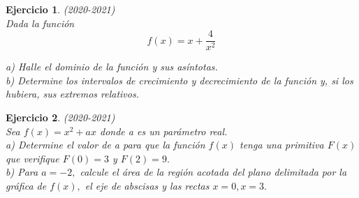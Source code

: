 \documentclass[12pt, a4paper]{amsart}
\newtheorem{ejer}{Ejercicio}
\begin{document}
\begin{ejer}\em (2020-2021)\\%
Dada la función
\[f (x) = x +\frac{4}{x^2}\]

a) Halle el dominio de la función y sus asíntotas.\\
b) Determine los intervalos de crecimiento y decrecimiento de la función y, si los hubiera, sus extremos relativos.
\end{ejer}

\begin{ejer}\em (2020-2021)\\%
Sea $f (x) = x^2 + ax$ donde a es un parámetro real.\\
a) Determine el valor de a para que la función $f (x)$ tenga una primitiva $F (x)$ que verifique $F (0) = 3$ y $F (2) = 9.$\\
b) Para $a = - 2,$ calcule el área de la región acotada del plano delimitada por la gráfica de $f (x),$ el eje de abscisas y las rectas $x = 0, x = 3.$
\end{ejer}
\end{document}
